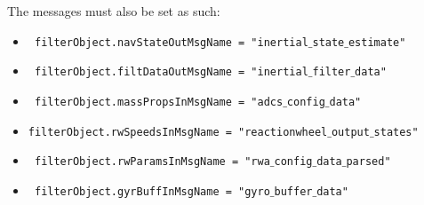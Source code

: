 The messages must also be set as such:

\begin{itemize}
\item    \texttt{ filterObject.navStateOutMsgName = "inertial$\_$state$\_$estimate"}
\item    \texttt{ filterObject.filtDataOutMsgName = "inertial$\_$filter$\_$data"}
\item   \texttt{ filterObject.massPropsInMsgName = "adcs$\_$config$\_$data"}
\item   \texttt{filterObject.rwSpeedsInMsgName = "reactionwheel$\_$output$\_$states"}
\item   \texttt{ filterObject.rwParamsInMsgName = "rwa$\_$config$\_$data$\_$parsed"}
\item   \texttt{  filterObject.gyrBuffInMsgName = "gyro$\_$buffer$\_$data"}
\end{itemize}

